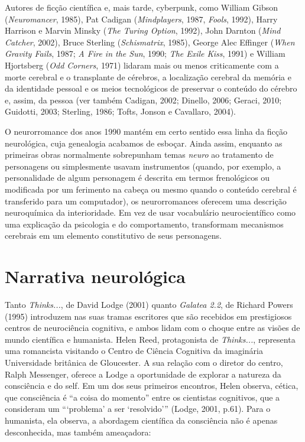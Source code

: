 Autores de ficção científica e, mais tarde, cyberpunk, como William
Gibson (\emph{Neuromancer}, 1985), Pat Cadigan (\emph{Mindplayers},
1987, \emph{Fools}, 1992), Harry Harrison e Marvin Minsky (\emph{The
Turing Option}, 1992), John Darnton (\emph{Mind Catcher}, 2002), Bruce
Sterling (\emph{Schismatrix}, 1985), George Alec Effinger (\emph{When
Gravity Fails}, 1987; \emph{A Fire in the Sun}, 1990; \emph{The Exile
Kiss}, 1991) e William Hjortsberg (\emph{Odd Corners}, 1971) lidaram
mais ou menos criticamente com a morte cerebral e o transplante de
cérebros, a localização cerebral da memória e da identidade pessoal e os
meios tecnológicos de preservar o conteúdo do cérebro e, assim, da
pessoa (ver também Cadigan, 2002; Dinello, 2006; Geraci, 2010; Guidotti,
2003; Sterling, 1986; Tofts, Jonson e Cavallaro, 2004).

O neurorromance dos anos 1990 mantém em certo sentido essa linha da
ficção neurológica, cuja genealogia acabamos de esboçar. Ainda assim,
enquanto as primeiras obras normalmente sobrepunham temas \emph{neuro}
ao tratamento de personagens ou simplesmente usavam instrumentos
(quando, por exemplo, a personalidade de algum personagem é descrita em
termos frenológicos ou modificada por um ferimento na cabeça ou mesmo
quando o conteúdo cerebral é transferido para um computador), os
neurorromances oferecem uma descrição neuroquímica da interioridade. Em
vez de usar vocabulário neurocientífico como uma explicação da
psicologia e do comportamento, transformam mecanismos cerebrais em um
elemento constitutivo de seus personagens.

\chapter{Narrativa neurológica}

Tanto \emph{Thinks...}, de David Lodge (2001) quanto \emph{Galatea 2.2},
de Richard Powers (1995) introduzem nas suas tramas escritores que são
recebidos em prestigiosos centros de neurociência cognitiva, e ambos
lidam com o choque entre as visões de mundo científica e humanista.
Helen Reed, protagonista de \emph{Thinks...}, representa uma romancista
visitando o Centro de Ciência Cognitiva da imaginária Universidade
britânica de Gloucester. A sua relação com o diretor do centro, Ralph
Messenger, oferece a Lodge a oportunidade de explorar a natureza da
consciência e do self. Em um dos seus primeiros encontros, Helen
observa, cética, que consciência é ``a coisa do momento'' entre os
cientistas cognitivos, que a consideram um ```problema' a ser
`resolvido''' (Lodge, 2001, p.61). Para o humanista, ela observa, a
abordagem científica da consciência não é apenas desconhecida, mas
também ameaçadora:


